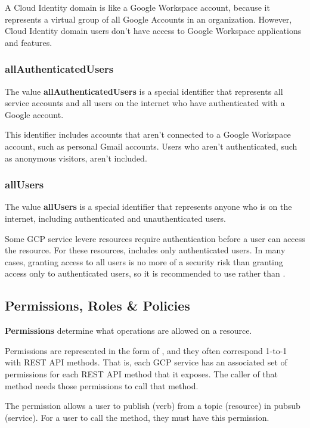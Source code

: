 A Cloud Identity domain is like a Google Workspace account, because it represents a virtual group of all Google
Accounts in an organization. However, Cloud Identity domain users don't have access to Google Workspace applications
and features.

\subsubsection{allAuthenticatedUsers}

\bd[allAuthenticatedUsers]
The value \textbf{allAuthenticatedUsers} is a special identifier that represents all service accounts and all users on
the internet who have authenticated with a Google account.
\ed

This identifier includes accounts that aren't connected to a Google Workspace account, such as personal Gmail accounts.
Users who aren't authenticated, such as anonymous visitors, aren't included.

\subsubsection{allUsers}

\bd[allUsers]
The value \textbf{allUsers} is a special identifier that represents anyone who is on the internet, including
authenticated and unauthenticated users.
\ed

Some GCP service levere resources require authentication before a user can access the resource. For these resources,
 includes only authenticated users. In many cases, granting access to all users is no more of a security
risk than granting access only to authenticated users, so it is recommended to use  rather than
.

\subsection{Permissions, Roles \& Policies}

\bd[Permissions]
\textbf{Permissions} determine what operations are allowed on a resource.
\ed

Permissions are represented in the form of , and they often correspond 1-to-1 with REST API
methods. That is, each GCP service has an associated set of permissions for each REST API method that it exposes. The
caller of that method needs those permissions to call that method.

\be
The permission  allows a user to publish (verb) from a topic (resource) in pubsub
(service). For a user to call the  method, they must have this permission.
\ee

